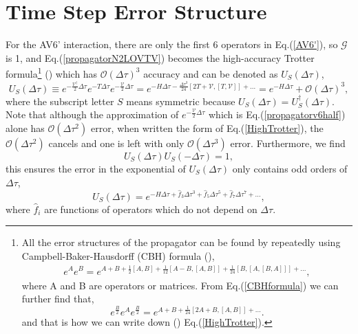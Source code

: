 \documentclass[12pt,letterpaper,UTF8]{report}
\begin{document}
\section{Time Step Error Structure}
\label{secErrEst}
For the AV6' interaction, there are only the first 6 operators in Eq.(\ref{AV6'}), so $\mathcal{G}$ is 1, and Eq.(\ref{propagatorN2LOVTV}) becomes the high-accuracy Trotter formula\footnote{All the error structures of the propagator can be found by repeatedly using Campbell-Baker-Hausdorff (CBH) formula (\cite{Reinsch2000JMP}),
\begin{eqnarray}
e^A e^B = e^{A+B+\frac{1}{2}[A,B]+\frac{1}{12}[A-B,[A,B]]+\frac{1}{24}[B,[A,[B,A]]] + ...},
\label{CBHformula}
 \end{eqnarray}
where A and B are operators or matrices. From Eq.(\ref{CBHformula}) we can further find that,
\begin{equation}
e^{\frac{B}{2} }  e^{A}  e^{\frac{B}{2}}
= e^{A+B
+ \frac{1}{24}[2A+B, [A,B]] + ... }.
\end{equation}
and that is how we can write down (\cite{VesaPDF}) Eq.(\ref{HighTrotter}).} (\cite{Feynman1948RMP,SchmidtLee95a}) which has $\mathcal{O}(\Delta \tau)^3$ accuracy and can be denoted as $U_S(\Delta \tau)$,
\begin{equation}
U_S(\Delta \tau) \equiv
e^{-\frac{\mathcal{V}^\dagger}{2} \Delta \tau }
e^{-T \Delta \tau} e^{-\frac{\mathcal{V}}{2} \Delta \tau }
= e^{- H \Delta \tau
- \frac{ {\Delta \tau}^3}{24}[2T+\mathcal{V}, [T,\mathcal{V}]] + ... }
= e^{- H \Delta \tau} + \mathcal{O}(\Delta \tau)^3,
\label{HighTrotter}
\end{equation}
where the subscript letter $S$ means symmetric because $U_S(\Delta \tau)=U^\dagger_S(\Delta \tau)$.
Note that although the approximation of $e^{-\frac{\mathcal{V}}{2} \Delta \tau }$ which is Eq.(\ref{propagatorv6half}) alone has $\mathcal{O}(\Delta \tau^2)$ error, when written the form of Eq.(\ref{HighTrotter}), the $\mathcal{O}(\Delta \tau^2)$ cancels and one is left with only $\mathcal{O}(\Delta \tau^3)$ error.
Furthermore, we find
\begin{equation}
U_S(\Delta \tau) U_S(-\Delta \tau)=1,
\label{USuni}
\end{equation}
this ensures the error in the exponential of $U_S(\Delta \tau)$ only contains odd orders of $\Delta \tau$,
\begin{equation}
U_S(\Delta \tau) = e^{-H \Delta \tau
+ \hat{f}_3 \Delta \tau^3
+ \hat{f}_5 \Delta \tau^5
+ \hat{f}_7 \Delta \tau^7 + ... } ,
\label{propagatorerrstruc}
\end{equation}
where $\hat{f}_i$ are functions of operators which do not depend on $\Delta \tau$.
\end{document}
